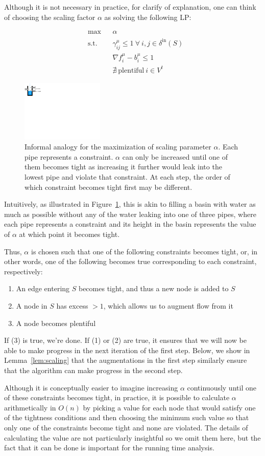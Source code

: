 \documentclass[11pt]{article}
\theoremstyle{definition}
\theoremstyle{definition}
\newcommand{\fu}{f^{\mu}}
\newcommand{\nfiu}{\nabla \fu_i}
\newcommand{\biu}{b_{i}^{\mu}}
\newcommand{\din}{\delta^{\text{in}}}
\newcommand{\vsink}{V^{t}}
\newcommand{\lpeq}[1] {
\begin{equation*}
\begin{aligned}
#1
\end{aligned}
\end{equation*}
}
\newcommand{\lpone}[3] {
& \underset{}{\text{#1}}
&& #2 \\
& \text{s.t.}
&& #3 
}
\newcommand{\lptwo}[4] {
\lpone{#1}{#2}{#3}\\
&&& #4
}
\newcommand{\lpthree}[5] {
\lptwo{#1}{#2}{#3}{#4}\\
&&& #5
}
\begin{document}
Although it is not necessary in practice, for clarify of explanation, one can think of choosing the scaling factor $\alpha$ as solving
the following LP:
\lpeq{\lpthree{max}
{\alpha}
{\gamma_{ij}^{\mu} \le 1\ \forall\ i,j \in \din(S)}
{\nfiu - \biu \le 1}
{\nexists\ \text{plentiful}\ i \in \vsink}
}
\begin{figure}[b!]
\centering
\includegraphics[width=0.35\textwidth]{figs/water.pdf}
\caption{
\label{fig:alpha}
Informal analogy for the maximization of scaling parameter $\alpha$.
Each pipe represents a constraint. $\alpha$ can only be increased until
one of them becomes tight as increasing it further would leak into
the lowest pipe and violate that constraint.
At each step, the order of which constraint becomes tight first may be different.
}
\end{figure}
Intuitively, as illustrated in Figure~\ref{fig:alpha}, this is akin to filling
a basin with water as much as possible without any of the water leaking into one
of three pipes, where each pipe represents a constraint and its height in the basin
represents the value of $\alpha$ at which point it becomes tight.

Thus, $\alpha$ is chosen such that one of the following constraints becomes
tight, or, in other words, one of the following becomes true corresponding to
each constraint, respectively:
\begin{enumerate}[itemsep=-1mm]
	\item An edge entering $S$ becomes tight, and thus a new node is added to $S$
	\item A node in $S$ has excess $>1$, which allows us to augment flow from it
	\item A node becomes plentiful
\end{enumerate}

If (3) is true, we're done. If (1) or (2) are true, it ensures that we will now
be able to make progress in the next iteration of the first step. Below, we show
in Lemma~\ref{lem:scaling} that the augmentations in the first step similarly ensure
that the algorithm can make progress in the second step. 

Although it is conceptually easier to imagine increasing $\alpha$ continuously
until one of these constraints becomes tight, in practice, it is possible to
calculate $\alpha$ arithmetically in $O(n)$ by picking a value for each node
that would satisfy one of the tightness conditions and then choosing the minimum
such value so that only one of the constraints become tight and none are
violated.
The details of calculating the value are not particularly insightful so we omit them here, but the
fact that it can be done is important for the running time analysis.
\end{document}
